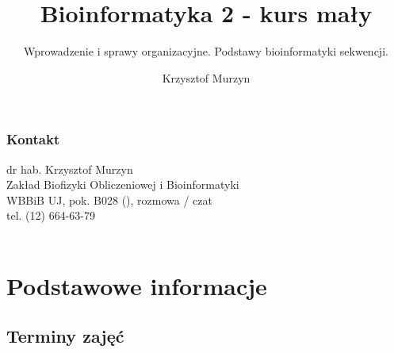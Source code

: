
\title[BT2-212: Wprowadzenie]{Bioinformatyka 2 - kurs mały}
\subtitle{Wprowadzenie i sprawy organizacyjne.\newline
          Podstawy bioinformatyki sekwencji.}
\author{Krzysztof Murzyn}
\date{}



\begin{frame}
 \titlepage
\end{frame}


\maketitle

\begin{frame}
\frametitle{Kontakt}\scriptsize
dr hab. Krzysztof Murzyn\\
Zakład Biofizyki Obliczeniowej i Bioinformatyki\\
WBBiB UJ, 
pok. B028 (),  rozmowa / czat\\
tel. (12) 664-63-79\\
\\
{}

\end{frame}

\section{Podstawowe informacje}

\subsection{Terminy zajęć}

